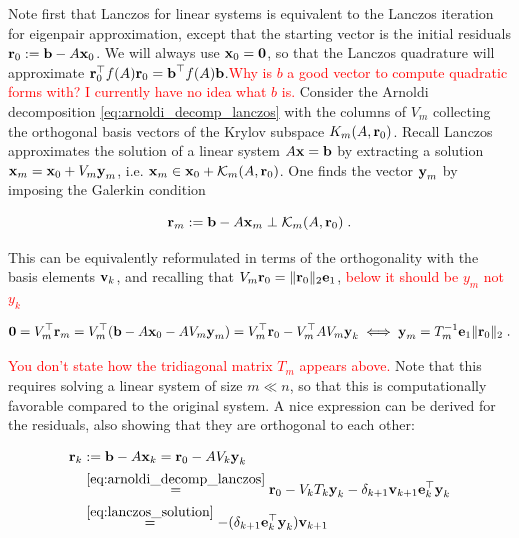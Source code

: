 \documentclass{article}
\begin{document}
{Note first that Lanczos for linear systems is equivalent to the Lanczos iteration for eigenpair approximation, except that the starting vector is the initial residuals $\boldsymbol{\mathbf{r}}_0 := \boldsymbol{\mathbf{b}} - A \boldsymbol{\mathbf{x}}_0$. We will always use $\boldsymbol{\mathbf{x}}_0 = \boldsymbol{\mathbf{0}}$, so that the Lanczos quadrature will approximate $\boldsymbol{\mathbf{r}}_0^\top f(A) \boldsymbol{\mathbf{r}}_0 = \boldsymbol{\mathbf{b}}^\top f(A) \boldsymbol{\mathbf{b}}$.\textcolor{red}{Why is $b$ a good vector to compute quadratic forms with? I currently have no idea what $b$ is.} 
Consider the Arnoldi decomposition \eqref{eq:arnoldi_decomp_lanczos} with the columns of $V_m$ collecting the orthogonal basis vectors of the Krylov subspace $K_m(A, \boldsymbol{\mathbf{r}}_0)$. Recall Lanczos approximates the solution of a linear system $A\boldsymbol{\mathbf{x}} = \boldsymbol{\mathbf{b}}$ by extracting a solution $\boldsymbol{\mathbf{x}}_m = \boldsymbol{\mathbf{x}}_0 + V_m \boldsymbol{\mathbf{y}}_m$, i.e. $\boldsymbol{\mathbf{x}}_m \in \boldsymbol{\mathbf{x}}_0 + \mathcal K_m(A, \boldsymbol{\mathbf{r}}_0)$. One finds the vector $\boldsymbol{\mathbf{y}}_m$ by imposing the Galerkin condition 

\begin{equation}
    \boldsymbol{\mathbf{r}}_m := \boldsymbol{\mathbf{b}} - A \boldsymbol{\mathbf{x}}_m \perp \mathcal K_m(A, \boldsymbol{\mathbf{r}}_0) \; .
\end{equation}

This can be equivalently reformulated in terms of the orthogonality with the basis elements $\boldsymbol{\mathbf{v}}_k$, and recalling that $V_m \boldsymbol{\mathbf{r}}_0 = \Vert \boldsymbol{\mathbf{r}}_0 \Vert_2 \boldsymbol{\mathbf{e}}_1$, \textcolor{red}{below it should be $y_m$ not $y_k$}

\begin{equation} \label{eq:lanczos_solution}
    \boldsymbol{\mathbf{0}} = V_m^\top \boldsymbol{\mathbf{r}}_m = V_m^\top (\boldsymbol{\mathbf{b}} - A \boldsymbol{\mathbf{x}}_0 - A V_m \boldsymbol{\mathbf{y}}_m) = V_m^\top \boldsymbol{\mathbf{r}}_0 - V_m^\top A V_m \boldsymbol{\mathbf{y}}_k 
    \iff \boldsymbol{\mathbf{y}}_m = T_m^{-1} \boldsymbol{\mathbf{e}}_1 \Vert \boldsymbol{\mathbf{r}}_0 \Vert_2 \; .
\end{equation}

\textcolor{red}{You don't state how the tridiagonal matrix $T_m$ appears above. }Note that this requires solving a linear system of size $m \ll n$, so that this is computationally favorable compared to the original system. A nice expression can be derived for the residuals, also showing that they are orthogonal to each other:

\begin{align}
    \boldsymbol{\mathbf{r}}_k &:= \boldsymbol{\mathbf{b}} - A \boldsymbol{\mathbf{x}}_k = \boldsymbol{\mathbf{r}}_0 - A V_k \boldsymbol{\mathbf{y}}_k\\
    &\stackrel{\eqref{eq:arnoldi_decomp_lanczos}}{=} \boldsymbol{\mathbf{r}}_0 - V_k T_k \boldsymbol{\mathbf{y}}_k - \delta_{k+1} \boldsymbol{\mathbf{v}}_{k+1} \boldsymbol{\mathbf{e}}_k^\top \boldsymbol{\mathbf{y}}_k\\
    &\stackrel{\eqref{eq:lanczos_solution}}{=} -(\delta_{k+1} \boldsymbol{\mathbf{e}}_k^\top \boldsymbol{\mathbf{y}}_k) \boldsymbol{\mathbf{v}}_{k+1} \label{eq:lanczos_residuals_basis_vec}
\end{align}

}
\end{document}
